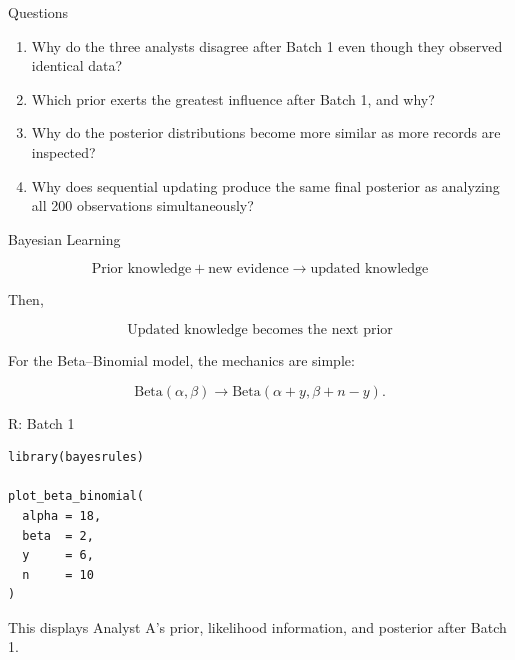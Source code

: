 \documentclass[aspectratio=43]{beamer}
\begin{document}
\begin{frame}{Questions}

\begin{enumerate}

  \item Why do the three analysts disagree after Batch 1 even though
        they observed identical data?

  \item Which prior exerts the greatest influence after Batch 1,
        and why?

  \item Why do the posterior distributions become more similar as
        more records are inspected?

  \item Why does sequential updating produce the same final posterior
        as analyzing all 200 observations simultaneously?

\end{enumerate}

\end{frame}

\begin{frame}{Bayesian Learning}

\[
\boxed{
\text{Prior knowledge}
+
\text{new evidence}
\longrightarrow
\text{updated knowledge}
}
\]

\vspace{0.45cm}

Then,

\[
\boxed{
\text{Updated knowledge becomes the next prior}
}
\]

\vspace{0.45cm}

For the Beta--Binomial model, the mechanics are simple:

\[
\mathrm{Beta}(\alpha,\beta)
\longrightarrow
\mathrm{Beta}(\alpha+y,\beta+n-y).
\]

\end{frame}

\begin{frame}[fragile]{R: Batch 1}

\begin{verbatim}
library(bayesrules)

plot_beta_binomial(
  alpha = 18,
  beta  = 2,
  y     = 6,
  n     = 10
)
\end{verbatim}

This displays Analyst A's prior, likelihood information,
and posterior after Batch 1.

\end{frame}
\end{document}
